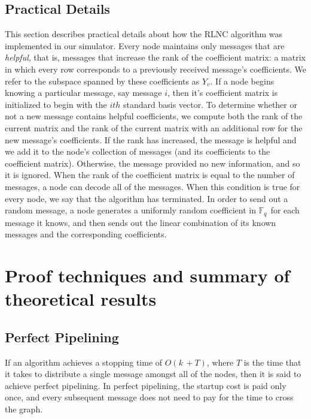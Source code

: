 \documentclass{article} %
\def\numMessages{\textit{k}\,}
\def\fieldSize{\textit{q}\,}
\begin{document}
\subsection{Practical Details}
This section describes practical details about how the RLNC algorithm was implemented in our simulator. Every node maintains only messages that are \textit{helpful}, that is, messages that increase the rank of the coefficient matrix: a matrix in which every row corresponds to a previously received message's coefficients. We refer to the subspace spanned by these coefficients as $Y_v$. If a node begins knowing a particular message, say message $i$, then it's coefficient matrix is initialized to begin with the $ith$ standard basis vector. To determine whether or not a new message contains helpful coefficients, we compute both the rank of the current matrix and the rank of the current matrix with an additional row for the new message's coefficients. If the rank has increased, the message is helpful and we add it to the node's collection of messages (and its coefficients to the coefficient matrix). Otherwise, the message provided no new information, and so it is ignored. When the rank of the coefficient matrix is equal to the number of messages, a node can decode all of the messages. When this condition is true for every node, we say that the algorithm has terminated. In order to send out a random message, a node generates a uniformly random coefficient in $\mathbb{F}_{\fieldSize}$ for each message it knows, and then sends out the linear combination of its known messages and the corresponding coefficients.

\section{Proof techniques and summary of theoretical results}
\subsection{Perfect Pipelining}
If an algorithm achieves a stopping time of $O(\numMessages + T)$, where $T$ is the time that it takes to distribute a single message amongst all of the nodes, then it is said to achieve perfect pipelining. In perfect pipelining, the startup cost is paid only once, and every subsequent message does not need to pay for the time to cross the graph. 
\end{document}
